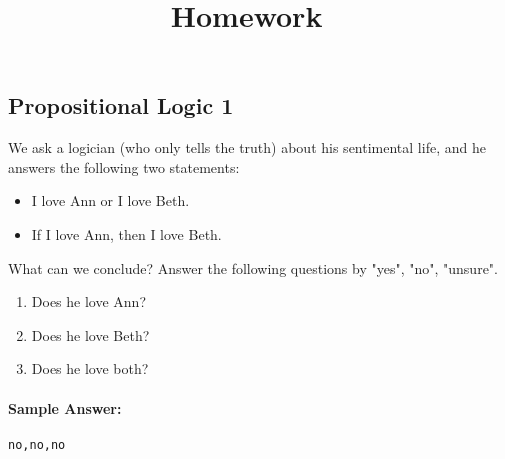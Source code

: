 \documentclass[11pt, answers]{exam}
\title{Homework \hmwkNumber\ \hmwkType}
\date{\hmwkDue}
\begin{document}
\maketitle

%
%
\begin{questions}
\section{Propositional Logic 1}
\question

We ask a logician (who only tells the truth) about his sentimental life, and he answers the following two statements:
\begin{itemize}
	\item I love Ann or I love Beth.
	\item If I love Ann, then I love Beth.
\end{itemize}
What can we conclude? Answer the following questions by "yes", "no", "unsure".

\begin{enumerate}
\item Does he love Ann?
\item Does he love Beth?
\item Does he love both?
\end{enumerate}

\paragraph{Sample Answer:}
\begin{verbatim}
no,no,no
\end{verbatim}
\end{questions}
\end{document}
